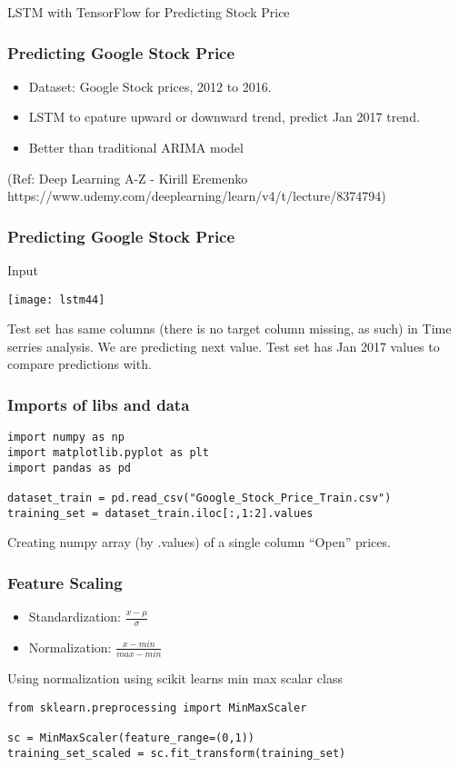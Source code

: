 \begin{frame}
  \begin{center}
    {\Large LSTM with TensorFlow for Predicting Stock Price}
    
  \end{center}
\end{frame}


\begin{frame}[fragile] \frametitle{Predicting Google Stock Price}
\begin{itemize}
\item Dataset: Google Stock prices, 2012 to 2016.
\item LSTM to cpature upward or downward trend, predict Jan 2017 trend.
\item Better than traditional ARIMA model
\end{itemize}
(Ref: Deep Learning A-Z - Kirill Eremenko https://www.udemy.com/deeplearning/learn/v4/t/lecture/8374794)
\end{frame}



\begin{frame}[fragile] \frametitle{Predicting Google Stock Price}
Input
\begin{center}
\texttt{[image: lstm44]}
\end{center}
Test set has same columns (there is no target column missing, as such) in Time serries analysis. We are predicting next value. Test set has Jan 2017 values to compare predictions with.
\end{frame}


\begin{frame}[fragile] \frametitle{Imports of libs and data}

\begin{lstlisting}
import numpy as np
import matplotlib.pyplot as plt
import pandas as pd

dataset_train = pd.read_csv("Google_Stock_Price_Train.csv")
training_set = dataset_train.iloc[:,1:2].values
\end{lstlisting}
Creating numpy array (by .values) of a single column ``Open'' prices.
\end{frame}

\begin{frame}[fragile] \frametitle{Feature Scaling}
\begin{itemize}
\item Standardization: $\frac{x - \mu}{\sigma}$
\item Normalization: $\frac{x - min}{max - min}$
\end{itemize}
Using normalization using scikit learns min max scalar class
\begin{lstlisting}
from sklearn.preprocessing import MinMaxScaler

sc = MinMaxScaler(feature_range=(0,1))
training_set_scaled = sc.fit_transform(training_set)
\end{lstlisting}
\end{frame}


